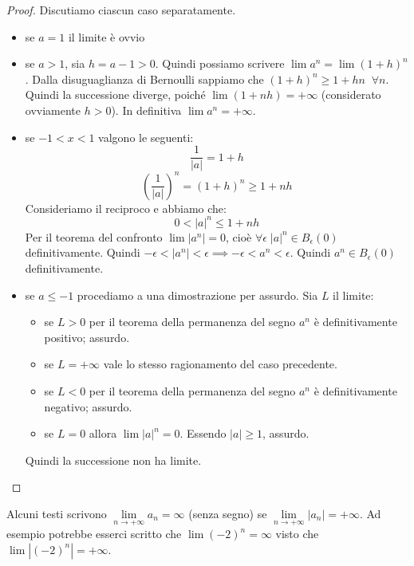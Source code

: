 \begin{proof}
Discutiamo ciascun caso separatamente.
\begin{itemize}
\item se $a=1$ il limite è ovvio
\item se $a>1$, sia $h = a - 1 > 0$. Quindi possiamo scrivere $\lim a^n = \lim (1+h)^n$. Dalla disuguaglianza di Bernoulli sappiamo che $(1+h)^n \ge 1 + hn \;\; \forall n$. Quindi la successione diverge, poiché $\lim (1 + nh) = +\infty$ (considerato ovviamente $h>0$). In definitiva $\lim a^n = +\infty$.

\item se $-1 < x < 1$ valgono le seguenti:
\begin{equation*}
\frac{1}{|a|} = 1 + h
\end{equation*}
\begin{equation*}
\left(\frac{1}{|a|}\right)^n = (1+h)^n \ge 1 + nh
\end{equation*}
Consideriamo il reciproco e abbiamo che:
\begin{equation*}
0 < |a|^n \le 1 + nh
\end{equation*}
Per il teorema del confronto $\lim |a^n| = 0$, cioè $\forall \epsilon \; |a|^n \in B_{\epsilon}(0)$ definitivamente. Quindi $-\epsilon < |a^n| < \epsilon \implies -\epsilon < a^n < \epsilon$. Quindi $a^n \in B_{\epsilon}(0)$ definitivamente.

\item se $a \le -1$ procediamo a una dimostrazione per assurdo. Sia $L$ il limite:
\begin{itemize}
\item se $L > 0$ per il teorema della permanenza del segno $a^n$ è definitivamente positivo; assurdo.
\item se $L = +\infty$ vale lo stesso ragionamento del caso precedente.
\item se $L < 0$ per il teorema della permanenza del segno $a^n$ è definitivamente negativo; assurdo.
\item se $L = 0$ allora $\lim |a|^n = 0$. Essendo $|a| \ge 1$, assurdo.
\end{itemize}
Quindi la successione non ha limite.
\end{itemize}
\end{proof}

\begin{remark}
Alcuni testi scrivono $\lim\limits_{n \to +\infty} a_n = \infty$ (senza segno) se $\lim\limits_{n \to +\infty} |a_n| = +\infty$. Ad esempio potrebbe esserci scritto che $\lim (-2)^n = \infty$ visto che $\lim |(-2)^n| = +\infty$.
\end{remark}

